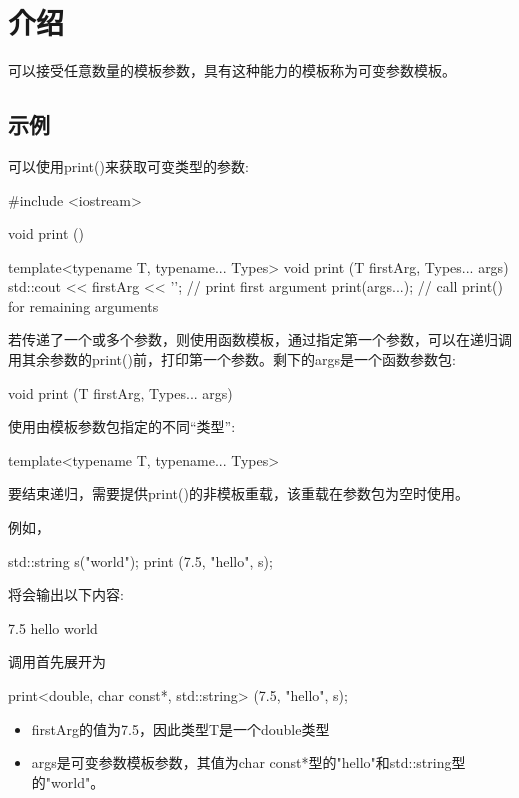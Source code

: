 \section{介绍}


可以接受任意数量的模板参数，具有这种能力的模板称为可变参数模板。

\subsection{示例}

可以使用print()来获取可变类型的参数:

\begin{cpp}
#include <iostream>

void print ()
{
}

template<typename T, typename... Types>
void print (T firstArg, Types... args)
{
	std::cout << firstArg << '\n'; // print first argument
	print(args...); // call print() for remaining arguments
}
\end{cpp}

若传递了一个或多个参数，则使用函数模板，通过指定第一个参数，可以在递归调用其余参数的print()前，打印第一个参数。剩下的args是一个函数参数包:

\begin{cpp}
void print (T firstArg, Types... args)
\end{cpp}

使用由模板参数包指定的不同“类型”:

\begin{cpp}
template<typename T, typename... Types>
\end{cpp}

要结束递归，需要提供print()的非模板重载，该重载在参数包为空时使用。

例如，

\begin{cpp}
std::string s("world");
print (7.5, "hello", s);
\end{cpp}

将会输出以下内容:

\begin{shell}
7.5
hello
world
\end{shell}

调用首先展开为

\begin{cpp}
print<double, char const*, std::string> (7.5, "hello", s);
\end{cpp}

\begin{itemize}
\item 
firstArg的值为7.5，因此类型T是一个double类型

\item 
args是可变参数模板参数，其值为char const*型的"hello"和std::string型的"world"。
\end{itemize}

